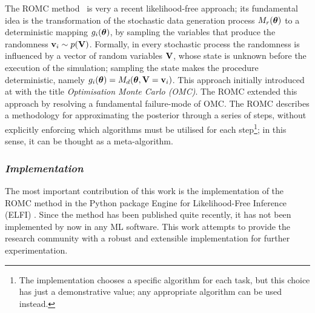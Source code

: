The ROMC method~\autocite{Ikonomov2019} is very a recent
likelihood-free approach; its fundamental idea is the transformation
of the stochastic data generation process $M_r(\boldsymbol{\theta})$ to a
deterministic mapping $g_i(\boldsymbol{\theta})$, by sampling the variables that
produce the randomness $\mathbf{v}_i \sim p(\mathbf{V})$. Formally, in every
stochastic process the randomness is influenced by a vector of random
variables $\mathbf{V}$, whose state is unknown before the execution of the
simulation; sampling the state makes the procedure deterministic,
namely $g_i(\boldsymbol{\theta}) = M_d(\boldsymbol{\theta}, \mathbf{V}=\mathbf{v}_i)$. This approach
initially introduced at \autocite{Meeds2015} with the title
\textit{Optimisation Monte Carlo (OMC)}. The ROMC extended this
approach by resolving a fundamental failure-mode of OMC\@. The ROMC
describes a methodology for approximating the posterior through a
series of steps, without explicitly enforcing which algorithms must be
utilised for each step\footnote{The implementation chooses a specific
  algorithm for each task, but this choice has just a demonstrative
  value; any appropriate algorithm can be used instead.}; in this
sense, it can be thought as a meta-algorithm.

\subsubsection*{\textit{Implementation}}

The most important contribution of this work is the implementation of
the ROMC method in the Python package Engine for Likelihood-Free
Inference (ELFI) \autocite{1708.00707}. Since the method has been
published quite recently, it has not been implemented by now in any ML
software. This work attempts to provide the research community with a
robust and extensible implementation for further experimentation.
